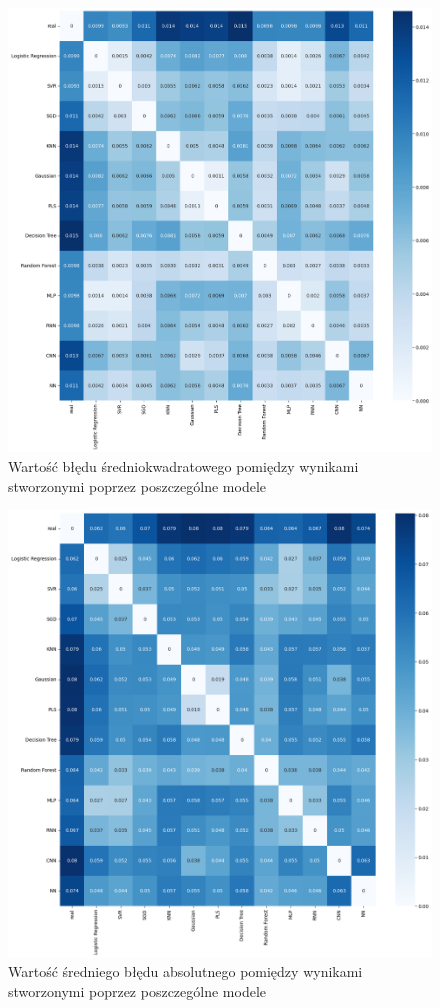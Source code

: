\begin{figure}[H]
    \centering
    \includegraphics[width=\textwidth]{images/mse_matrix.png}
    \caption{Wartość błędu średniokwadratowego pomiędzy wynikami stworzonymi poprzez poszczególne modele}
    \label{mse-matrix}
\end{figure}

\begin{figure}[H]
    \centering
    \includegraphics[width=\textwidth]{images/mae_matrix.png}
    \caption{Wartość średniego błędu absolutnego pomiędzy wynikami stworzonymi poprzez poszczególne modele}
    \label{mae-matrix}
\end{figure}

